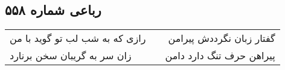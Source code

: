 \begin{center}
\section*{رباعی شماره ۵۵۸}
\label{sec:sh558}
\begin{longtable}{l p{0.5cm} r}
رازی که به شب لب تو گوید با من
&&
گفتار زبان نگرددش پیرامن
\\
زان سر به گریبان سخن برنارد
&&
پیراهن حرف تنگ دارد دامن
\\
\end{longtable}
\end{center}
